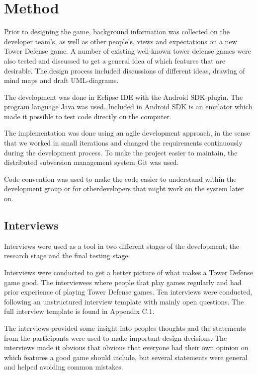 \chapter{Method}

Prior to designing the game, background information was collected on the developer team's, as well as other people's, views and expectations on a new Tower Defense game. A number of existing well-known tower defense games were also tested and discussed to get a general idea of which features that are desirable. The design process included discussions of different ideas, drawing of mind maps and draft UML-diagrams.

The development was done in Eclipse IDE with the Android SDK-plugin. The program language Java was used. Included in Android SDK is an emulator which made it possible to test code directly on the computer.

The implementation was done using an agile development approach, in the sense that we worked in small iterations and changed the requirements continuously during the development process. To make the project easier to maintain, the distributed subversion management system Git was used.

Code convention was used to make the code easier to understand within the development group or for otherdevelopers that might work on the system later on. 

\section{Interviews}

Interviews were used as a tool in two different stages of the development; the research stage and the final testing stage.

Interviews were conducted to get a better picture of what makes a Tower Defense game good. The interviewees where people that play games regularly and had prior experience of playing Tower Defense games. Ten interviews were conducted, following an unstructured interview template with mainly open questions. The full interview template is found in Appendix C.1. 

The interviews provided some insight into peoples thoughts and the statements from the participants were used to make important design decisions. The interviews made it obvious that obvious that everyone had their own opinion on which features a good game should include, but several statements were general and helped avoiding common mistakes. 

